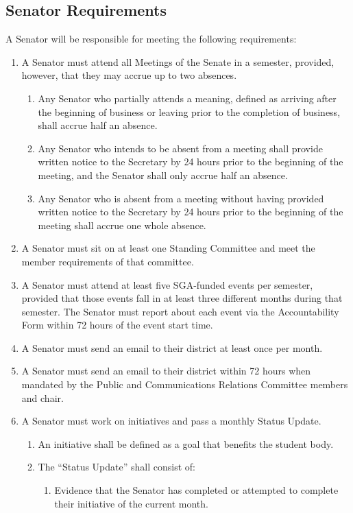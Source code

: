 \documentclass[12pt]{scrreprt}
\begin{document}
\subsection{Senator Requirements}
A Senator will be responsible for meeting the following requirements:
\begin{enumerate}
    \item A Senator must attend all Meetings of the Senate in a semester, provided, however, that they may accrue up to two absences.
    \begin{enumerate}
        \item Any Senator who partially attends a meaning, defined as arriving after the beginning of business or leaving prior to the completion of business, shall accrue half an absence.
        \item Any Senator who intends to be absent from a meeting shall provide written notice to the Secretary by 24 hours prior to the beginning of the meeting, and the Senator shall only accrue half an absence.
        \item Any Senator who is absent from a meeting without having provided written notice to the Secretary by 24 hours prior to the beginning of the meeting shall accrue one whole absence.
    \end{enumerate}
    \item A Senator must sit on at least one Standing Committee and meet the member requirements of that committee.
    \item A Senator must attend at least five SGA-funded events per semester, provided that those events fall in at least three different months during that semester. The Senator must report about each event via the Accountability Form within 72 hours of the event start time.
    \item A Senator must send an email to their district at least once per month.
    \item A Senator must send an email to their district within 72 hours when mandated by the Public and Communications Relations Committee members and chair.
    \item A Senator must work on initiatives and pass a monthly Status Update.
    \begin{enumerate}
        \item An initiative shall be defined as a goal that benefits the student body.
        \item The “Status Update” shall consist of:
        \begin{enumerate}
            \item Evidence that the Senator has completed or attempted to complete their initiative of the current month.

\end{enumerate}
\end{enumerate}
\end{enumerate}
\end{document}
